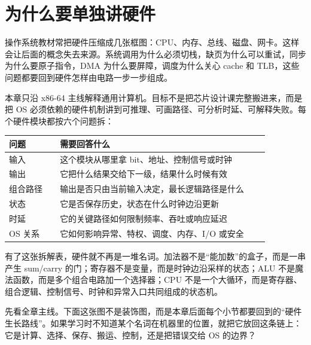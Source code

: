 \section{为什么要单独讲硬件}

操作系统教材常把硬件压缩成几张框图：CPU、内存、总线、磁盘、网卡。这样会让后面的概念失去来源。系统调用为什么必须切栈，缺页为什么可以重试，同步为什么要原子指令，DMA 为什么要屏障，调度为什么关心 cache 和 TLB，这些问题都要回到硬件怎样由电路一步一步组成。

本章只沿 x86-64 主线解释通用计算机。目标不是把芯片设计课完整搬进来，而是把 OS 必须依赖的硬件机制讲到可推理、可画路径、可分析时延、可解释失败。每个硬件模块都按六个问题拆：

\begin{longtable}{p{0.18\linewidth}p{0.74\linewidth}}
\toprule
问题 & 需要回答什么 \\
\midrule
输入 & 这个模块从哪里拿 bit、地址、控制信号或时钟 \\
输出 & 它把什么结果交给下一级，结果什么时候有效 \\
组合路径 & 输出是否只由当前输入决定，最长逻辑路径是什么 \\
状态 & 它是否保存历史，状态在什么时钟边沿更新 \\
时延 & 它的关键路径如何限制频率、吞吐或响应延迟 \\
OS 关系 & 它如何影响异常、特权、调度、内存、I/O 或安全 \\
\bottomrule
\end{longtable}

有了这张拆解表，硬件就不再是一堆名词。加法器不是“能加数”的盒子，而是一串产生 sum/carry 的门；寄存器不是变量，而是时钟边沿采样的状态；ALU 不是魔法函数，而是多个组合电路加一个选择器；CPU 不是一个大循环，而是寄存器、组合逻辑、控制信号、时钟和异常入口共同组成的状态机。

先看全章主线。下面这张图不是装饰图，而是本章后面每个小节都要回到的“硬件生长路线”。如果学习时不知道某个名词在机器里的位置，就把它放回这条链上：它是计算、选择、保存、搬运、控制，还是把错误交给 OS 的边界？

